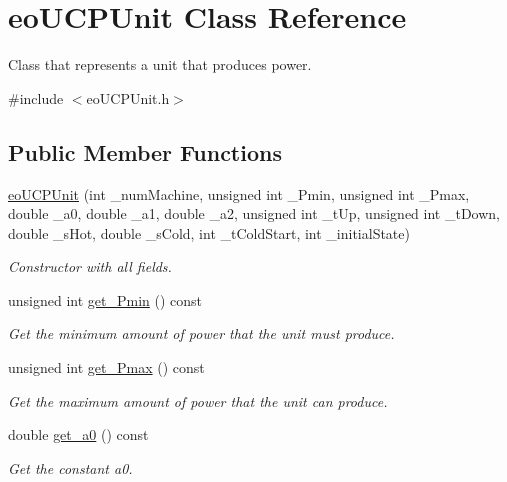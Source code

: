 \hypertarget{classeo_u_c_p_unit}{\section{eo\-U\-C\-P\-Unit \-Class \-Reference}
\label{classeo_u_c_p_unit}
}


\-Class that represents a unit that produces power.  




{\ttfamily \#include $<$eo\-U\-C\-P\-Unit.\-h$>$}

\subsection*{\-Public \-Member \-Functions}
\begin{DoxyCompactItemize}
\item 
\hyperlink{classeo_u_c_p_unit_acd2782315937bbbc3da2301009423116}{eo\-U\-C\-P\-Unit} (int \-\_\-num\-Machine, unsigned int \-\_\-\-Pmin, unsigned int \-\_\-\-Pmax, double \-\_\-a0, double \-\_\-a1, double \-\_\-a2, unsigned int \-\_\-t\-Up, unsigned int \-\_\-t\-Down, double \-\_\-s\-Hot, double \-\_\-s\-Cold, int \-\_\-t\-Cold\-Start, int \-\_\-initial\-State)
\begin{DoxyCompactList}\small\item\em \-Constructor with all fields. \end{DoxyCompactList}\item 
unsigned int \hyperlink{classeo_u_c_p_unit_aad42435e6647b2a8c217ea46f995c084}{get\-\_\-\-Pmin} () const 
\begin{DoxyCompactList}\small\item\em \-Get the minimum amount of power that the unit must produce. \end{DoxyCompactList}\item 
unsigned int \hyperlink{classeo_u_c_p_unit_a9a862eea7650d7caa68b362533b0b5bd}{get\-\_\-\-Pmax} () const 
\begin{DoxyCompactList}\small\item\em \-Get the maximum amount of power that the unit can produce. \end{DoxyCompactList}\item 
double \hyperlink{classeo_u_c_p_unit_ad67c106bdf17bb7a3dfd4109755ecaa8}{get\-\_\-a0} () const 
\begin{DoxyCompactList}\small\item\em \-Get the constant a0. \end{DoxyCompactList}\item 

\end{DoxyCompactItemize}
